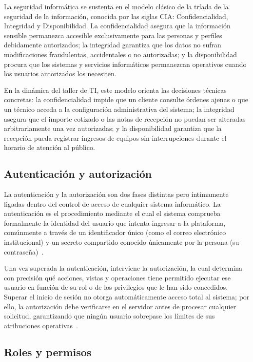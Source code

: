 La seguridad informática se sustenta en el modelo clásico de la tríada de la seguridad de la información, conocida por las siglas CIA: Confidencialidad, Integridad y Disponibilidad. La confidencialidad asegura que la información sensible permanezca accesible exclusivamente para las personas y perfiles debidamente autorizados; la integridad garantiza que los datos no sufran modificaciones fraudulentas, accidentales o no autorizadas; y la disponibilidad procura que los sistemas y servicios informáticos permanezcan operativos cuando los usuarios autorizados los necesiten.

En la dinámica del taller de TI, este modelo orienta las decisiones técnicas concretas: la confidencialidad impide que un cliente consulte órdenes ajenas o que un técnico acceda a la configuración administrativa del sistema; la integridad asegura que el importe cotizado o las notas de recepción no puedan ser alteradas arbitrariamente una vez autorizadas; y la disponibilidad garantiza que la recepción pueda registrar ingresos de equipos sin interrupciones durante el horario de atención al público.

\subsection{Autenticación y autorización}

La autenticación y la autorización son dos fases distintas pero íntimamente ligadas dentro del control de acceso de cualquier sistema informático. La autenticación es el procedimiento mediante el cual el sistema comprueba formalmente la identidad del usuario que intenta ingresar a la plataforma, comúnmente a través de un identificador único (como el correo electrónico institucional) y un secreto compartido conocido únicamente por la persona (su contraseña)~\cite{owasp_authentication, laravel_authentication}.

Una vez superada la autenticación, interviene la autorización, la cual determina con precisión qué acciones, vistas y operaciones tiene permitido ejecutar ese usuario en función de su rol o de los privilegios que le han sido concedidos. Superar el inicio de sesión no otorga automáticamente acceso total al sistema; por ello, la autorización debe verificarse en el servidor antes de procesar cualquier solicitud, garantizando que ningún usuario sobrepase los límites de sus atribuciones operativas~\cite{owasp_authorization}.

\subsection{Roles y permisos}

